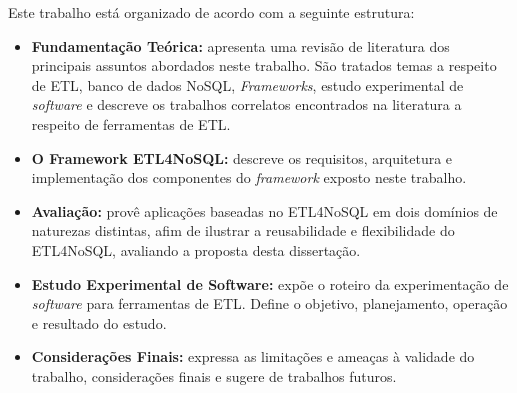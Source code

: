 Este trabalho está organizado de acordo com a seguinte estrutura:

\begin{itemize}
	\item \textbf{Fundamentação Teórica:} apresenta uma revisão de literatura dos principais assuntos abordados neste trabalho. São tratados temas a respeito de ETL, banco de dados NoSQL, \textit{Frameworks}, estudo experimental de \textit{software} e descreve os trabalhos correlatos encontrados na literatura a respeito de ferramentas de ETL.
	
	\item \textbf{O Framework ETL4NoSQL:} descreve os requisitos, arquitetura e implementação dos componentes do \textit{framework} exposto neste trabalho.
	
	\item \textbf{Avaliação:} provê aplicações baseadas no ETL4NoSQL em dois domínios de naturezas distintas, afim de ilustrar a reusabilidade e flexibilidade do ETL4NoSQL, avaliando a proposta desta dissertação.
		
	\item \textbf{Estudo Experimental de Software:} expõe o roteiro da experimentação de \textit{software} para ferramentas de ETL. Define o objetivo, planejamento, operação e resultado do estudo.
	
	\item \textbf{Considerações Finais:} expressa as limitações e ameaças à validade do trabalho, considerações finais e sugere de trabalhos futuros.	
	
\end{itemize}

